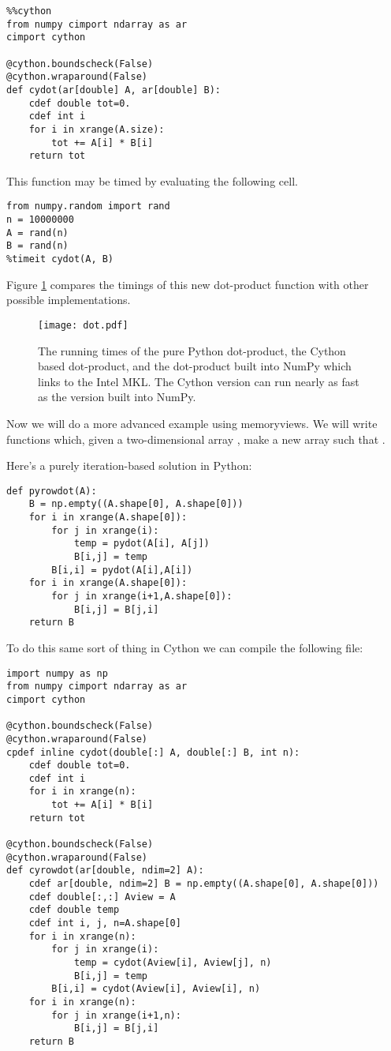 \begin{lstlisting}
%%cython
from numpy cimport ndarray as ar
cimport cython

@cython.boundscheck(False)
@cython.wraparound(False)
def cydot(ar[double] A, ar[double] B):
    cdef double tot=0.
    cdef int i
    for i in xrange(A.size):
        tot += A[i] * B[i]
    return tot
\end{lstlisting}
This function may be timed by evaluating the following cell.
\begin{lstlisting}
from numpy.random import rand
n = 10000000
A = rand(n)
B = rand(n)
%timeit cydot(A, B)
\end{lstlisting}

Figure \ref{cython:dot} compares the timings of this new dot-product function with other possible implementations.

\begin{figure}
\centering
\texttt{[image: dot.pdf]}
\caption{
The running times of the pure Python dot-product, the Cython based dot-product, and the dot-product built into NumPy which links to the Intel MKL.
The Cython version can run nearly as fast as the version built into NumPy.
}
\label{cython:dot}
\end{figure}

Now we will do a more advanced example using memoryviews.
We will write functions which, given a two-dimensional array , make a new array  such that
.

Here's a purely iteration-based solution in Python:
\begin{lstlisting}
def pyrowdot(A):
    B = np.empty((A.shape[0], A.shape[0]))
    for i in xrange(A.shape[0]):
        for j in xrange(i):
            temp = pydot(A[i], A[j])
            B[i,j] = temp
        B[i,i] = pydot(A[i],A[i])
    for i in xrange(A.shape[0]):
        for j in xrange(i+1,A.shape[0]):
            B[i,j] = B[j,i]
    return B
\end{lstlisting}

To do this same sort of thing in Cython we can compile the following file:

\begin{lstlisting}
import numpy as np
from numpy cimport ndarray as ar
cimport cython

@cython.boundscheck(False)
@cython.wraparound(False)
cpdef inline cydot(double[:] A, double[:] B, int n):
    cdef double tot=0.
    cdef int i
    for i in xrange(n):
        tot += A[i] * B[i]
    return tot

@cython.boundscheck(False)
@cython.wraparound(False)
def cyrowdot(ar[double, ndim=2] A):
    cdef ar[double, ndim=2] B = np.empty((A.shape[0], A.shape[0]))
    cdef double[:,:] Aview = A
    cdef double temp
    cdef int i, j, n=A.shape[0]
    for i in xrange(n):
        for j in xrange(i):
            temp = cydot(Aview[i], Aview[j], n)
            B[i,j] = temp
        B[i,i] = cydot(Aview[i], Aview[i], n)
    for i in xrange(n):
        for j in xrange(i+1,n):
            B[i,j] = B[j,i]
    return B
\end{lstlisting}

